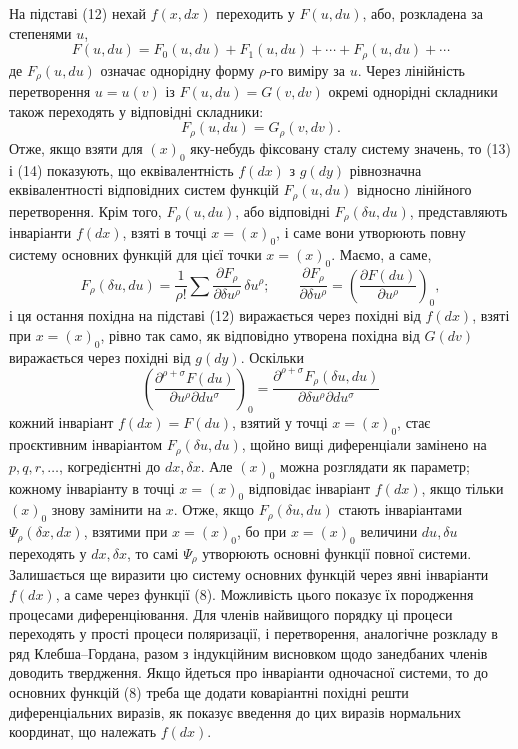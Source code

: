 \documentclass[11pt]{article}
\begin{document}
На підставі (12) нехай \(f(x,dx)\) переходить у \(F(u,du)\), або, розкладена за степенями \(u\),
\begin{equation}
F(u,du)=F_0(u,du)+F_1(u,du)+\cdots+F_\rho(u,du)+\cdots
\tag{13}
\end{equation}
де \(F_\rho(u,du)\) означає однорідну форму \(\rho\)-го виміру за \(u\). Через лінійність перетворення \(u=u(v)\) із \(F(u,du)=G(v,dv)\) окремі однорідні складники також переходять у відповідні складники:
\begin{equation}
F_\rho(u,du)=G_\rho(v,dv).
\tag{14}
\end{equation}
Отже, якщо взяти для \((x)_0\) яку-небудь фіксовану сталу систему значень, то (13) і (14) показують, що еквівалентність \(f(dx)\) з \(g(dy)\) рівнозначна еквівалентності відповідних систем функцій \(F_\rho(u,du)\) відносно лінійного перетворення. Крім того, \(F_\rho(u,du)\), або відповідні \(F_\rho(\delta u,du)\), представляють інваріанти \(f(dx)\), взяті в точці \(x=(x)_0\), і саме вони утворюють повну систему основних функцій для цієї точки \(x=(x)_0\). Маємо, а саме,
\[
F_\rho(\delta u,du)=\frac1{\rho!}\sum
\frac{\partial F_\rho}{\partial \delta u^\rho}\,\delta u^\rho;
\qquad
\frac{\partial F_\rho}{\partial \delta u^\rho}
=\left(\frac{\partial F(du)}{\partial u^\rho}\right)_0,
\]
і ця остання похідна на підставі (12) виражається через похідні від \(f(dx)\), взяті при \(x=(x)_0\), рівно так само, як відповідно утворена похідна від \(G(dv)\) виражається через похідні від \(g(dy)\). Оскільки
\[
\left(\frac{\partial^{\rho+\sigma}F(du)}
{\partial u^\rho\partial du^\sigma}\right)_0
=
\frac{\partial^{\rho+\sigma}F_\rho(\delta u,du)}
{\partial\delta u^\rho\partial du^\sigma}
\]
кожний інваріант \(f(dx)=F(du)\), взятий у точці \(x=(x)_0\), стає проєктивним інваріантом \(F_\rho(\delta u,du)\), щойно вищі диференціали замінено на \(p,q,r,\ldots\), когредієнтні до \(dx,\delta x\). Але \((x)_0\) можна розглядати як параметр; кожному інваріанту в точці \(x=(x)_0\) відповідає інваріант \(f(dx)\), якщо тільки \((x)_0\) знову замінити на \(x\). Отже, якщо \(F_\rho(\delta u,du)\) стають інваріантами \(\Psi_\rho(\delta x,dx)\), взятими при \(x=(x)_0\), бо при \(x=(x)_0\) величини \(du,\delta u\) переходять у \(dx,\delta x\), то самі \(\Psi_\rho\) утворюють основні функції повної системи. Залишається ще виразити цю систему основних функцій через явні інваріанти \(f(dx)\), а саме через функції (8). Можливість цього показує їх породження процесами диференціювання. Для членів найвищого порядку ці процеси переходять у прості процеси поляризації, і перетворення, аналогічне розкладу в ряд Клебша--Гордана, разом з індукційним висновком щодо занедбаних членів доводить твердження. Якщо йдеться про інваріанти одночасної системи, то до основних функцій (8) треба ще додати коваріантні похідні решти диференціальних виразів, як показує введення до цих виразів нормальних координат, що належать \(f(dx)\).
\end{document}
